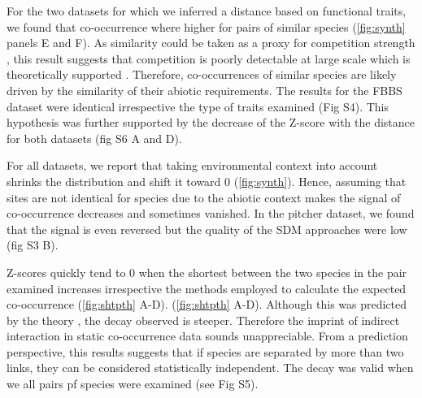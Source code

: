 For the two datasets for which we inferred a distance based on
functional traits, we found that co-occurrence where higher for pairs of
similar species (\ref{fig:synth} panels E and F). As similarity could be
taken as a proxy for competition strength \citep{Morales_Castilla_2015},
this result suggests that competition is poorly detectable at large
scale which is theoretically supported \citep{Araujo2014}. Therefore,
co-occurrences of similar species are likely driven by the similarity of
their abiotic requirements. The results for the FBBS dataset were
identical irrespective the type of traits examined (Fig S4). This
hypothesis was further supported by the decrease of the Z-score with the
distance for both datasets (fig S6 A and D).

For all datasets, we report that taking environmental context into
account shrinks the distribution and shift it toward 0
(\ref{fig:synth}). Hence, assuming that sites are not identical for
species due to the abiotic context makes the signal of co-occurrence
decreases and sometimes vanished. In the pitcher dataset, we found that
the signal is even reversed but the quality of the SDM approaches were
low (fig S3 B).

Z-scores quickly tend to 0 when the shortest between the two species in
the pair examined increases irrespective the methods employed to
calculate the expected co-occurrence (\ref{fig:shtpth} A-D).
(\ref{fig:shtpth} A-D). Although this was predicted by the theory
\citep{Cazelles_2015}, the decay observed is steeper. Therefore the
imprint of indirect interaction in static co-occurrence data sounds
unappreciable. From a prediction perspective, this results suggests that
if species are separated by more than two links, they can be considered
statistically independent. The decay was valid when we all pairs pf
species were examined (see Fig S5).

